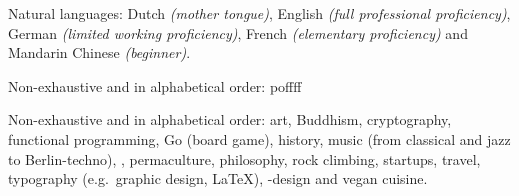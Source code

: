 \documentclass[10pt,a4paper]{article}
\begin{document}
\vspace{0.5em}
\inlineheadsection
  {Natural languages:}
  {Dutch \emph{(mother tongue)}, English \emph{(full professional proficiency)}, German \emph{(limited working proficiency)}, French \emph{(elementary proficiency)} and Mandarin Chinese \emph{(beginner)}.}


\spacedhrule{1.6em}{-0.4em}


\inlineheadsection
{Non-exhaustive and in alphabetical order:}
{
poffff
}




\spacedhrule{1.6em}{-0.4em}


\inlineheadsection
  {Non-exhaustive and in alphabetical order:}
  {art, Buddhism, cryptography, functional programming, Go (board game), history, music (from classical and jazz to Berlin-techno), , permaculture, philosophy, rock climbing, startups, travel, typography (e.g.\ graphic design, \LaTeX), -design and vegan cuisine.}
\end{document}

